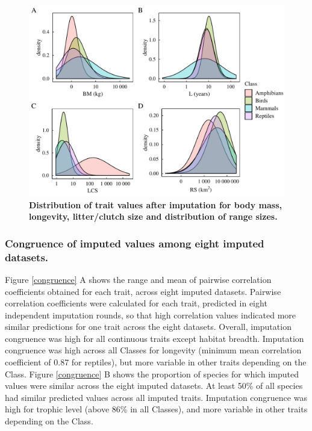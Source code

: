 \begin{figure}[h!]
\centering
\includegraphics[scale=0.7]{figures/chapter2/Imputation_errors/Distributions}
\caption[Distribution of trait values after imputation for body mass, longevity, litter/clutch size and distribution of range sizes]{\textbf{Distribution of trait values after imputation for body mass, longevity, litter/clutch size and distribution of range sizes.}}
\label{traitdist}
\end{figure}


\pagebreak
\subsubsection{Congruence of imputed values among eight imputed datasets.}

Figure \ref{congruence} A shows the range and mean of pairwise correlation coefficients obtained for each trait, across eight imputed datasets. Pairwise correlation coefficients were calculated for each trait, predicted in eight independent imputation rounds, so that high correlation  values indicated more similar predictions for one trait across the eight datasets. Overall, imputation congruence was high for all continuous traits except habitat breadth. Imputation congruence was high across all Classes for longevity (minimum mean correlation coefficient of 0.87 for reptiles), but more variable in other traits depending on the Class.
Figure \ref{congruence} B shows the proportion of species for which imputed values were similar across the eight imputed datasets. At least 50\% of all species had similar predicted values across all imputed traits. Imputation congruence was high for trophic level (above 86\% in all Classes), and more variable in other traits depending on the Class. 

